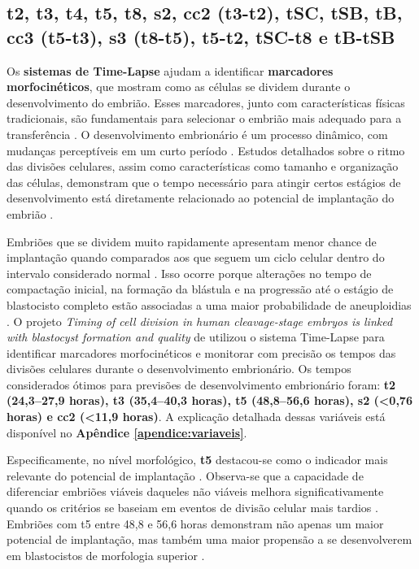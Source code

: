 \subsection{t2, t3, t4, t5, t8, s2, cc2 (t3-t2), tSC, tSB, tB, cc3 (t5-t3), s3 (t8-t5), t5-t2,  tSC-t8 e tB-tSB}

Os \textbf{sistemas de Time-Lapse} ajudam a identificar \textbf{marcadores morfocinéticos}, que mostram como as células se dividem durante o desenvolvimento do embrião. Esses marcadores, junto com características físicas tradicionais, são fundamentais para selecionar o embrião mais adequado para a transferência \cite{souzarebeca2022}. O desenvolvimento embrionário é um processo dinâmico, com mudanças perceptíveis em um curto período \cite{cruz2012}. Estudos detalhados sobre o ritmo das divisões celulares, assim como características como tamanho e organização das células, demonstram que o tempo necessário para atingir certos estágios de desenvolvimento está diretamente relacionado ao potencial de implantação do embrião \cite{souzarebeca2022}.

Embriões que se dividem muito rapidamente apresentam menor chance de implantação quando comparados aos que seguem um ciclo celular dentro do intervalo considerado normal \cite{cruz2012}. Isso ocorre porque alterações no tempo de compactação inicial, na formação da blástula e na progressão até o estágio de blastocisto completo estão associadas a uma maior probabilidade de aneuploidias \cite{cruz2012}. O projeto \textit{Timing of cell division in human cleavage-stage embryos is linked with blastocyst formation and quality} de  utilizou o sistema Time-Lapse para identificar marcadores morfocinéticos e monitorar com precisão os tempos das divisões celulares durante o desenvolvimento embrionário. Os tempos considerados ótimos para previsões de desenvolvimento embrionário foram: \textbf{t2 (24,3{–}27,9 horas), t3 (35,4{–}40,3 horas), t5 (48,8{–}56,6 horas), s2 (<0,76 horas) e cc2 (<11,9 horas)}. A explicação detalhada dessas variáveis está disponível no \textbf{Apêndice \ref{apendice:variaveis}}.

Especificamente, no nível morfológico, \textbf{t5} destacou-se como o indicador mais relevante do potencial de implantação \cite{cruz2012}. Observa-se que a capacidade de diferenciar embriões viáveis daqueles não viáveis melhora significativamente quando os critérios se baseiam em eventos de divisão celular mais tardios \cite{cruz2012}. Embriões com t5 entre 48,8 e 56,6 horas demonstram não apenas um maior potencial de implantação, mas também uma maior propensão a se desenvolverem em blastocistos de morfologia superior \cite{cruz2012}.

